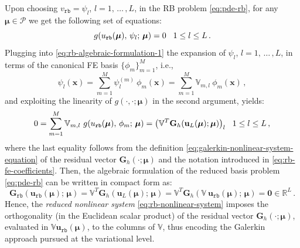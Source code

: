 \documentclass[12pt, a4paper, twoside, openright]{report}
\numberwithin{equation}{chapter}
\theoremstyle{theorem}
\theoremstyle{definition}
\theoremstyle{remark}
\theoremstyle{proposition}
\numberwithin{figure}{chapter}
\newcommand{\bg}[1]{\boldsymbol{#1}}
\begin{document}
		Upon choosing $v_{\texttt{rb}} = \psi_l$, $l = 1, \, \ldots \, , L$, in the RB problem \eqref{eq:pde-rb}, for any $\bg{\mu} \in \mathcal{P}$ we get the following set of equations:
		\begin{equation}
			\label{eq:rb-algebraic-formulation-1}
			g(u_{\texttt{rb}}(\bg{\mu}), \, \psi_l; \, \bg{\mu}) = 0 \hspace*{0.3cm} 1 \leq l \leq L \, .
		\end{equation}
		Plugging into \eqref{eq:rb-algebraic-formulation-1} the expansion of $\psi_l$, $l = 1, \, \ldots \, , L$, in terms of the canonical FE basis $\big\lbrace \phi_m \big\rbrace_{m = 1}^M$, i.e.,
		\begin{equation*}
			\psi_l(\bg{x}) = \sum_{m = 1}^M \psi_l^{(m)} ~ \phi_m(\bg{x}) = \sum_{m = 1}^M \mathbb{V}_{m,l} ~ \phi_m(\bg{x}) \, ,
		\end{equation*} 
		and exploiting the linearity of $g(\cdot,\cdot; \bg{\mu})$ in the second argument, yields:
		\begin{equation*}
			0 = \sum_{m = 1}^M \mathbb{V}_{m,l} ~ g(u_{\texttt{rb}}(\bg{\mu}), \, \phi_m; \, \bg{\mu}) = \big( \mathbb{V}^T \mathbf{G}_h(\mathbf{u}_L(\bg{\mu}); \bg{\mu}) \big)_l \hspace*{0.3cm} 1 \leq l \leq L \, ,
		\end{equation*}
		where the last equality follows from the definition \eqref{eq:galerkin-nonlinear-system-equation} of the residual vector $\mathbf{G}_h(\cdot; \bg{\mu})$ and the notation introduced in \eqref{eq:rb-fe-coefficients}. Then, the algebraic formulation of the reduced basis problem \eqref{eq:pde-rb} can be written in compact form as:
		\begin{equation}
			\label{eq:rb-nonlinear-system}
			\mathbf{G}_{\texttt{rb}}(\mathbf{u}_{\texttt{rb}}(\bg{\mu}); \, \bg{\mu}) = \mathbb{V}^T \mathbf{G}_h(\mathbf{u}_L(\bg{\mu}); \, \bg{\mu}) = \mathbb{V}^T \mathbf{G}_h(\mathbb{V} ~ \mathbf{u}_{\texttt{rb}}(\bg{\mu}); \, \bg{\mu}) = \bg{0} \in \mathbb{R}^L \, .
		\end{equation}
		Hence, the \emph{reduced nonlinear system} \eqref{eq:rb-nonlinear-system} imposes the orthogonality (in the Euclidean scalar product) of the residual vector $\mathbf{G}_h(\cdot; \bg{\mu})$, evaluated in $\mathbb{V} \mathbf{u}_{\texttt{rb}}(\bg{\mu})$, to the columns of $\mathbb{V}$, thus encoding the Galerkin approach pursued at the variational level.
		
\end{document}
